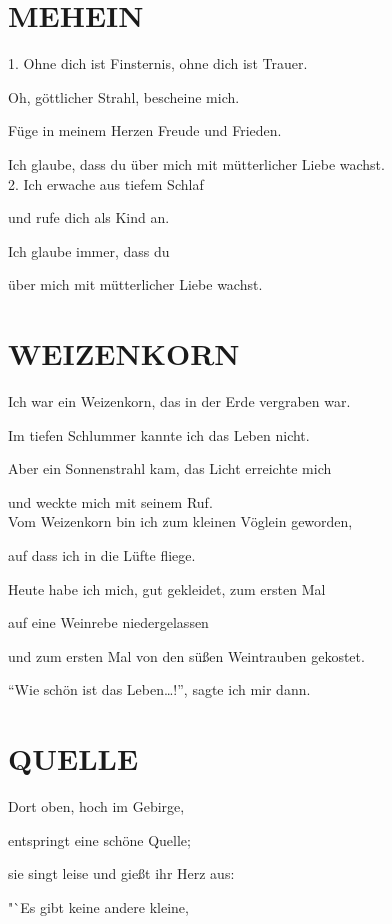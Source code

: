\documentclass[11pt,a5paper,twoside]{article}
\begin{document}
\section[Mehein]{MEHEIN}

1. Ohne dich ist Finsternis, ohne dich ist Trauer. 

Oh, göttlicher Strahl, bescheine mich.

Füge in meinem Herzen Freude und Frieden. 

Ich glaube, dass du über mich mit mütterlicher Liebe wachst. \\

2. Ich erwache aus tiefem Schlaf

und rufe dich als Kind an.

Ich glaube immer, dass du

über mich mit mütterlicher Liebe wachst.

\section[Weizenkorn]{WEIZENKORN}

Ich war ein Weizenkorn, das in der Erde vergraben war.

Im tiefen Schlummer kannte ich das Leben nicht.

Aber ein Sonnenstrahl kam, das Licht erreichte mich

und weckte mich mit seinem Ruf. \\

Vom Weizenkorn bin ich zum kleinen Vöglein geworden,

auf dass ich in die Lüfte fliege. 

Heute habe ich mich, gut gekleidet, zum ersten Mal

auf eine Weinrebe niedergelassen 

und zum ersten Mal von den süßen Weintrauben gekostet.

"`Wie schön ist das Leben…!"', sagte ich mir dann. \\


\section[Quelle]{QUELLE}

Dort oben, hoch im Gebirge,

entspringt eine schöne Quelle;

sie singt leise und gießt ihr Herz aus:

"`Es gibt keine andere kleine, 
\end{document}
